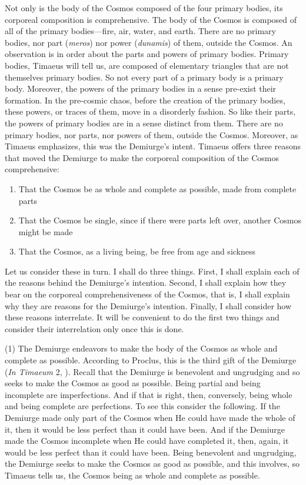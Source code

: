 Not only is the body of the Cosmos composed of the four primary bodies, its corporeal composition is comprehensive. The body of the Cosmos is composed of all of the primary bodies---fire, air, water, and earth. There are no primary bodies, nor part (\emph{meros}) nor power (\emph{dunamis}) of them, outside the Cosmos. An observation is in order about the parts and powers of primary bodies. Primary bodies, Timaeus will tell us, are composed of elementary triangles that are not themselves primary bodies. So not every part of a primary body is a primary body. Moreover, the powers of the primary bodies in a sense pre-exist their formation. In the pre-cosmic chaos, before the creation of the primary bodies, these powers, or traces of them, move in a disorderly fashion. So like their parts, the powers of primary bodies are in a sense distinct from them. There are no primary bodies, nor parts, nor powers of them, outside the Cosmos. Moreover, as Timaeus emphasizes, this was the Demiurge's intent. Timaeus offers three reasons that moved the Demiurge to make the corporeal composition of the Cosmos comprehensive:
\begin{enumerate}[(1)]
	\item That the Cosmos be as whole and complete as possible, made from complete parts
	\item That the Cosmos be single, since if there were parts left over, another Cosmos might be made
	\item That the Cosmos, as a living being, be free from age and sickness
\end{enumerate}
Let us consider these in turn. I shall do three things. First, I shall explain each of the reasons behind the Demiurge's intention. Second, I shall explain how they bear on the corporeal comprehensiveness of the Cosmos, that is, I shall explain why they are reasons for the Demiurge's intention. Finally, I shall consider how these reasons interrelate. It will be convenient to do the first two things and consider their interrelation only once this is done.

(1) The Demiurge endeavors to make the body of the Cosmos as whole and complete as possible. According to Proclus, this is the third gift of the Demiurge (\emph{In Timaeum} 2, \citealt{Diehl:1903re}). Recall that the Demiurge is benevolent and ungrudging and so seeks to make the Cosmos as good as possible. Being partial and being incomplete are imperfections. And if that is right, then, conversely, being whole and being complete are perfections. To see this consider the following. If the Demiurge made only part of the Cosmos when He could have made the whole of it, then it would be less perfect than it could have been. And if the Demiurge made the Cosmos incomplete when He could have completed it, then, again, it would be less perfect than it could have been. Being benevolent and ungrudging, the Demiurge seeks to make the Cosmos as good as possible, and this involves, so Timaeus tells us, the Cosmos being as whole and complete as possible.

